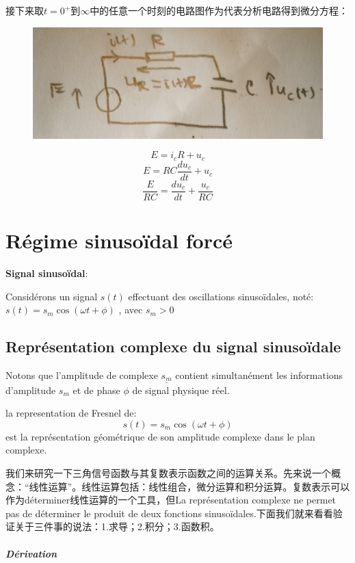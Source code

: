 \documentclass[12pt]{book}
\theoremstyle{definition}\newtheorem{dfn}{Définition}[chapter]
\theoremstyle{plain}\newtheorem{thm}{Théorème}[chapter]
\theoremstyle{plain}\newtheorem{prp}{Proposition}[chapter]
\theoremstyle{plain}\newtheorem{lem}{\bf Lemme}[chapter]
\theoremstyle{plain}\newtheorem{axm}{\bf Axiome}[chapter]
\theoremstyle{plain}\newtheorem{lmm}{\bf Lemme}[chapter]
\theoremstyle{plain}\newtheorem{cor}{\bf Corollaire}[chapter]
\theoremstyle{remark}\newtheorem{rem}{Remarque}[chapter]
\begin{document}
接下来取$t=0^+$到$\infty$中的任意一个时刻的电路图作为代表分析电路得到微分方程：
\begin{figure}[H]
	\centering
		\includegraphics[scale=0.1]{image//Circuit lineaire du premier ordre//3}
\end{figure}


	$$E = i_cR+u_c$$
	$$E = RC\frac{du_c}{dt}+u_c$$
	$$
	\frac{E}{RC}= \frac{du_c}{dt}+\frac{u_c}{RC}
	$$

\chapter{Régime
	sinusoïdal forcé}

\textbf{Signal sinusoïdal}:

Considérons un signal $s(t)$ effectuant des oscillations sinusoïdales, noté: $s(t)=s_m\cos(\omega t+\phi)$
, avec $s_m>0$


\section{Représentation complexe du signal sinusoïdale}
Notons que l'amplitude de complexe $\underline{s_m}$ contient simultanément les informations
d'amplitude
$s_m$ et de phase $\phi$
de signal physique réel.

la representation de Fresnel de:$$
s(t)=s_m\cos(\omega t+\phi)
$$
est la représentation géométrique de son {\color{red}amplitude complexe} dans
le plan complexe.

我们来研究一下三角信号函数与其复数表示函数之间的运算关系。先来说一个概念：“线性运算”。线性运算包括：线性组合，微分运算和积分运算。复数表示可以作为déterminer线性运算的一个工具，但La représentation complexe ne
permet pas de déterminer le produit
de deux fonctions sinusoïdales.下面我们就来看看验证关于三件事的说法：1.求导；2.积分；3.函数积。

\paragraph{Dérivation}
\end{document}
